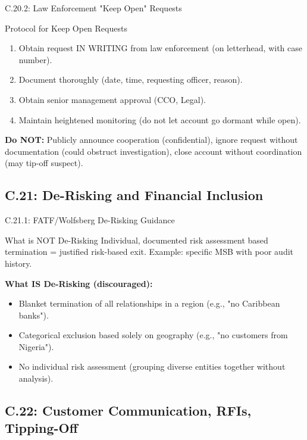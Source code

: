 \documentclass{beamer}
\begin{document}
	\begin{frame}{C.20.2: Law Enforcement "Keep Open" Requests}
		\begin{block}{Protocol for Keep Open Requests}
			\begin{enumerate}
				\item Obtain request IN WRITING from law enforcement (on letterhead, with case number).
				\item Document thoroughly (date, time, requesting officer, reason).
				\item Obtain senior management approval (CCO, Legal).
				\item Maintain heightened monitoring (do not let account go dormant while open).
			\end{enumerate}
		\end{block}
		\textbf{Do NOT:} Publicly announce cooperation (confidential), ignore request without documentation (could obstruct investigation), close account without coordination (may tip-off suspect).
	\end{frame}
	
	\subsection{C.21: De-Risking and Financial Inclusion}
	
	\begin{frame}{C.21.1: FATF/Wolfsberg De-Risking Guidance}
		\begin{block}{What is NOT De-Risking}
			Individual, documented risk assessment based termination = justified risk-based exit. Example: specific MSB with poor audit history.
		\end{block}
		\textbf{What IS De-Risking (discouraged):}
		\begin{itemize}
			\item Blanket termination of all relationships in a region (e.g., "no Caribbean banks").
			\item Categorical exclusion based solely on geography (e.g., "no customers from Nigeria").
			\item No individual risk assessment (grouping diverse entities together without analysis).
		\end{itemize}
	\end{frame}
	
	\subsection{C.22: Customer Communication, RFIs, Tipping-Off}
	
\end{document}
